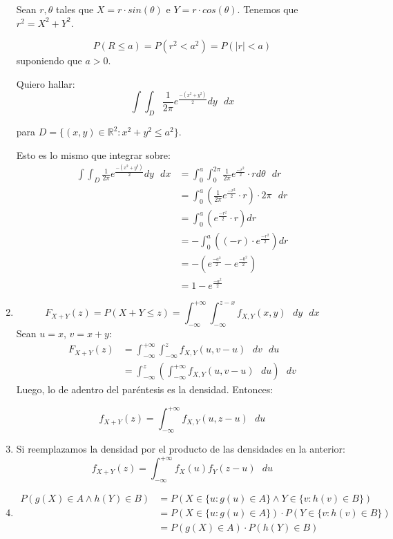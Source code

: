 \begin{enumerate}
		Sean $r, \theta$ tales que $X = r\cdot sin(\theta)$ e $Y = r \cdot cos(\theta)$.
		Tenemos que $r^2 = X^2 + Y^2$.
		
		$$P(R \leq a) = P(r^2 < a^2) = P(|r| < a)$$
		suponiendo que $a > 0$.
		
		Quiero hallar:
		$$\int\int_D \frac{1}{2\pi} e^{\frac{-(x^2 + y^2)}{2}} dy\text{ }dx$$
		
		para $D = \{(x, y) \in \mathbb{R}^2 : x^2 + y^2 \leq a^2\}$.		
		
		Esto es lo mismo que integrar sobre:
		\begin{align*}
			\int\int_D \frac{1}{2\pi} e^{\frac{-(x^2 + y^2)}{2}} dy\text{ }dx
				& = \int_0^a\int_0^{2\pi} \frac{1}{2\pi} e^{\frac{-r^2}{2}} \cdot r d\theta\text{ }dr\\
				& = \int_0^a \left(\frac{1}{2\pi} e^{\frac{-r^2}{2}} \cdot r\right) \cdot 2\pi\text{ }dr \\
				& = \int_0^a (e^{\frac{-r^2}{2}} \cdot r) dr \\
				& = -\int_0^a ((-r)\cdot e^{\frac{-r^2}{2}}) dr \\
				& = -(e^{\frac{-a^2}{2}} -e^{\frac{-0^2}{2}}) \\
				& = 1 - e^{\frac{-a^2}{2}}
		\end{align*}
	
	\item
		$$F_{X+Y}(z) = P(X+Y \leq z) = \int_{-\infty}^{+\infty} \int_{-\infty}^{z-x} f_{X,Y}(x, y)\text{ }dy\text{ }dx$$
		Sean $u=x$, $v=x+y$:
		\begin{align*}
			F_{X+Y}(z)	& = \int_{-\infty}^{+\infty} \int_{-\infty}^{z} f_{X,Y}(u, v-u)\text{ }dv\text{ }du \\
						& = \int_{-\infty}^{z} \left(\int_{-\infty}^{+\infty} f_{X,Y}(u, v-u)\text{ }du\right)\text{ }dv
		\end{align*}
		Luego, lo de adentro del paréntesis es la densidad. Entonces:
		
		$$f_{X+Y}(z) = \int_{-\infty}^{+\infty} f_{X,Y}(u, z-u)\text{ }du$$
		
	\item
		Si reemplazamos la densidad por el producto de las densidades en la anterior:
		$$f_{X+Y}(z) = \int_{-\infty}^{+\infty} f_{X}(u)f_Y(z-u)\text{ }du$$
		
	\item
		\begin{align*}
			P(g(X) \in A \land h(Y) \in B)	& = P(X\in\{u:g(u) \in A\} \land Y\in\{v:h(v) \in B\})		\\
											& = P(X\in\{u:g(u) \in A\})\cdot P(Y\in\{v:h(v) \in B\})	\\
											& = P(g(X) \in A)\cdot P(h(Y) \in B)
		\end{align*}
		

\end{enumerate}
